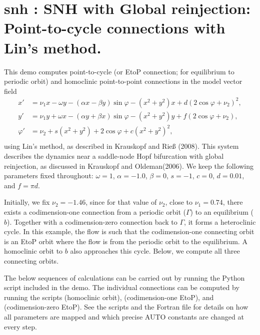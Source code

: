 \documentclass[12pt]{report}
\begin{document}
\newpage
\section{ snh : SNH with Global reinjection: Point-to-cycle connections with Lin's method.} \label{sec:Demos_snh}
This demo computes point-to-cycle
(or EtoP connection; for equilibrium to periodic orbit)
and homoclinic point-to-point connections in the model vector field
\begin{equation} \begin{array}{cl}
  x' &=  \nu_1 x - \omega y - (\alpha x - \beta y) \sin \varphi -
  (x^2+y^2)x + d (2 \cos \varphi+\nu_2)^2, \\
  y' &=  \nu_1 y + \omega x - (\alpha y + \beta x) \sin \varphi -
  (x^2+y^2) y + f (2 \cos \varphi+\nu_2),  \\
  \varphi' &=  \nu_2 + s (x^2+y^2) + 2 \cos \varphi + c(x^2+y^2)^2,
  \\ \end{array} \end{equation}
using Lin's method, as described in Krauskopf and Rie\ss
(2008). %
This system describes the dynamics near a saddle-node Hopf bifurcation
with global reinjection, as discussed in Krauskopf and Oldeman(2006).
We keep the following parameters fixed throughout: $\omega=1$,
$\alpha=-1.0$, $\beta=0$, $s=-1$, $c=0$, $d=0.01$, and $f=\pi d$.

Initially, we fix $\nu_2=-1.46$, since
for that value of $\nu_2$, close to $\nu_1=0.74$,
there exists a codimension-one connection from a periodic orbit
($\Gamma$) to an equilibrium ($b$). Together with a codimension-zero connection
back to $\Gamma$, it forms a heteroclinic cycle. In this example, the
flow is such that the codimension-one connecting orbit is an EtoP
orbit where the flow is from the periodic orbit to the equilibrium.
A homoclinic orbit
to $b$ also approaches this cycle. Below, we compute all three
connecting orbits.

The below sequences of calculations can be carried out by
running the Python script  included in the demo.
The individual connections can be computed by running the scripts
 (homoclinic orbit),  (codimension-one
EtoP), and  (codimension-zero EtoP).
See the scripts and the Fortran file  for details on
how all parameters are mapped and which precise AUTO constants
are changed at every step.
\end{document}
